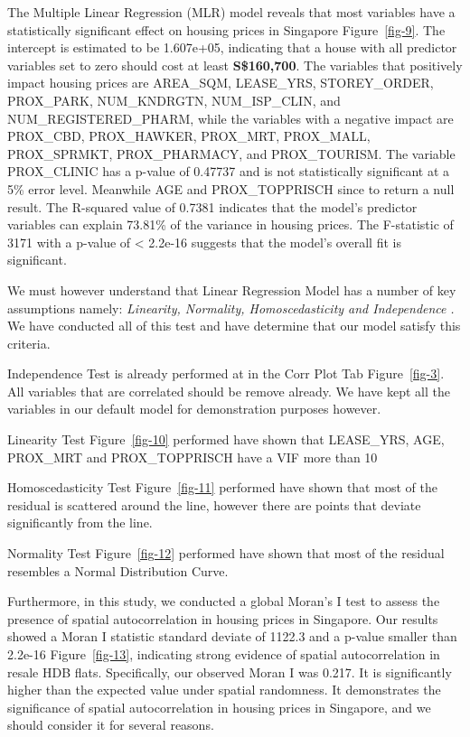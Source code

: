 \documentclass[manuscript,screen]{acmart}
\begin{document}
The Multiple Linear Regression (MLR) model reveals that most variables
have a statistically significant effect on housing prices in Singapore
Figure~\ref{fig-9}. The intercept is estimated to be 1.607e+05,
indicating that a house with all predictor variables set to zero should
cost at least \textbf{S\$160,700}. The variables that positively impact
housing prices are AREA\_SQM, LEASE\_YRS, STOREY\_ORDER, PROX\_PARK,
NUM\_KNDRGTN, NUM\_ISP\_CLIN, and NUM\_REGISTERED\_PHARM, while the
variables with a negative impact are PROX\_CBD, PROX\_HAWKER, PROX\_MRT,
PROX\_MALL, PROX\_SPRMKT, PROX\_PHARMACY, and PROX\_TOURISM. The
variable PROX\_CLINIC has a p-value of 0.47737 and is not statistically
significant at a 5\% error level. Meanwhile AGE and PROX\_TOPPRISCH
since to return a null result. The R-squared value of 0.7381 indicates
that the model's predictor variables can explain 73.81\% of the variance
in housing prices. The F-statistic of 3171 with a p-value of \textless{}
2.2e-16 suggests that the model's overall fit is significant.

We must however understand that Linear Regression Model has a number of
key assumptions namely: \emph{Linearity, Normality, Homoscedasticity and
Independence} \citep{ernst2017}\emph{.} We have conducted all of this
test and have determine that our model satisfy this criteria.

Independence Test is already performed at in the Corr Plot Tab
Figure~\ref{fig-3}. All variables that are correlated should be remove
already. We have kept all the variables in our default model for
demonstration purposes however.

Linearity Test Figure~\ref{fig-10} performed have shown that LEASE\_YRS,
AGE, PROX\_MRT and PROX\_TOPPRISCH have a VIF more than 10

Homoscedasticity Test Figure~\ref{fig-11} performed have shown that most
of the residual is scattered around the line, however there are points
that deviate significantly from the line.

Normality Test Figure~\ref{fig-12} performed have shown that most of the
residual resembles a Normal Distribution Curve.

Furthermore, in this study, we conducted a global Moran's I test to
assess the presence of spatial autocorrelation in housing prices in
Singapore. Our results showed a Moran I statistic standard deviate of
1122.3 and a p-value smaller than 2.2e-16 Figure~\ref{fig-13},
indicating strong evidence of spatial autocorrelation in resale HDB
flats. Specifically, our observed Moran I was 0.217. It is significantly
higher than the expected value under spatial randomness. It demonstrates
the significance of spatial autocorrelation in housing prices in
Singapore, and we should consider it for several reasons.
\end{document}
